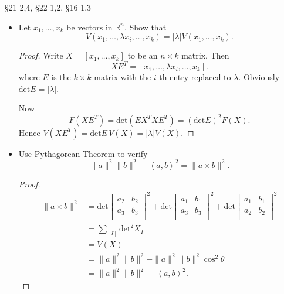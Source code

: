 
§21 2,4, §22 1,2, §16 1,3

\begin{itemize}
	\item [21.2] Let $x_1, \ldots, x_k$ be vectors in $\mathbb{R}^n$. Show that
		\[
			V(x_1, \ldots, \lambda x_i, \ldots, x_k) = |\lambda| V(x_1, \ldots, x_k)
		.\] 
\begin{proof}
	Write $X = [x_1, \ldots, x_k]$ to be an $n \times  k$ matrix. Then
	\[
		X E^T = [x_1, \ldots, \lambda x_i, \ldots, x_k]
	.\] 
	where $E$ is the $k \times  k$ matrix with the $i$-th entry replaced to $\lambda$. Obviously $\text{det}E = |\lambda|$.

	Now
	\[
		F(X E^T) = \text{det}(E X^T X E^T) = (\text{det} E)^2 F(X)
	.\] 
	Hence $V(XE^T) = \text{det}E \,V(X) = |\lambda| V\left(X \right) $.
\end{proof}

\item [21.4] Use Pythagorean Theorem to verify 
	\[
		\|a\|^2 \|b\|^2 - \left\langle a,b \right\rangle ^2 = \|a \times b\|^2
	.\] 
\begin{proof}
	\begin{align*}
		\|a \times b\|^2
		&=
		\text{det}
		\begin{bmatrix}
			a_2 & b_2 \\
			a_3 & b_3 \\
		\end{bmatrix}
		^2
		+
		\text{det}
		\begin{bmatrix}
			a_1 & b_1 \\
		a_3 & b_3 \\
		\end{bmatrix}
		^2
		+
		\text{det}
		\begin{bmatrix}
			a_1 & b_1 \\
			a_2 & b_2 \\
		\end{bmatrix}
		^2\\
		&= \sum_{[I]} \text{det}^2 X_I \\
		&= V(X)\\
		&= \|a\|^2\|b\|^2 - \|a\|^2 \|b\|^2 \cos^2 \theta\\
		&= \|a\|^2 \|b\|^2 - \left\langle a,b \right\rangle ^2 
	.\end{align*}

\end{proof}


\end{itemize}
